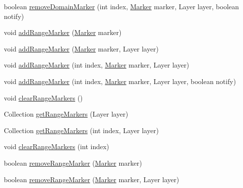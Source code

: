 \begin{DoxyCompactItemize}
\item 
boolean \mbox{\hyperlink{classorg_1_1jfree_1_1chart_1_1plot_1_1_category_plot_a48336c7fe313ae4cd1fa4431236295d0}{remove\+Domain\+Marker}} (int index, \mbox{\hyperlink{classorg_1_1jfree_1_1chart_1_1plot_1_1_marker}{Marker}} marker, Layer layer, boolean notify)
\item 
void \mbox{\hyperlink{classorg_1_1jfree_1_1chart_1_1plot_1_1_category_plot_ab061ff38b94f1ee346e7d49a3c0140b6}{add\+Range\+Marker}} (\mbox{\hyperlink{classorg_1_1jfree_1_1chart_1_1plot_1_1_marker}{Marker}} marker)
\item 
void \mbox{\hyperlink{classorg_1_1jfree_1_1chart_1_1plot_1_1_category_plot_a231e8e9773d07ab24d15452adf8bea19}{add\+Range\+Marker}} (\mbox{\hyperlink{classorg_1_1jfree_1_1chart_1_1plot_1_1_marker}{Marker}} marker, Layer layer)
\item 
void \mbox{\hyperlink{classorg_1_1jfree_1_1chart_1_1plot_1_1_category_plot_a250168a71cfe48c6c97003806a3a585b}{add\+Range\+Marker}} (int index, \mbox{\hyperlink{classorg_1_1jfree_1_1chart_1_1plot_1_1_marker}{Marker}} marker, Layer layer)
\item 
void \mbox{\hyperlink{classorg_1_1jfree_1_1chart_1_1plot_1_1_category_plot_a9be653af2b5f007727578a14ac92453b}{add\+Range\+Marker}} (int index, \mbox{\hyperlink{classorg_1_1jfree_1_1chart_1_1plot_1_1_marker}{Marker}} marker, Layer layer, boolean notify)
\item 
void \mbox{\hyperlink{classorg_1_1jfree_1_1chart_1_1plot_1_1_category_plot_a8d328087c6f781c211f40c6af8af6025}{clear\+Range\+Markers}} ()
\item 
Collection \mbox{\hyperlink{classorg_1_1jfree_1_1chart_1_1plot_1_1_category_plot_ab255d628550a67ceff7dd5a4d58ba9be}{get\+Range\+Markers}} (Layer layer)
\item 
Collection \mbox{\hyperlink{classorg_1_1jfree_1_1chart_1_1plot_1_1_category_plot_abe445338e7bcd63480f291c5dbac24fc}{get\+Range\+Markers}} (int index, Layer layer)
\item 
void \mbox{\hyperlink{classorg_1_1jfree_1_1chart_1_1plot_1_1_category_plot_a2bf4600bbed1d743d9975c18b038c29e}{clear\+Range\+Markers}} (int index)
\item 
boolean \mbox{\hyperlink{classorg_1_1jfree_1_1chart_1_1plot_1_1_category_plot_a3531bdfbf6ce80dd9de8f2dab5fcc61a}{remove\+Range\+Marker}} (\mbox{\hyperlink{classorg_1_1jfree_1_1chart_1_1plot_1_1_marker}{Marker}} marker)
\item 
boolean \mbox{\hyperlink{classorg_1_1jfree_1_1chart_1_1plot_1_1_category_plot_adb5a2b51c5ccf0145d3170da5c686ff5}{remove\+Range\+Marker}} (\mbox{\hyperlink{classorg_1_1jfree_1_1chart_1_1plot_1_1_marker}{Marker}} marker, Layer layer)

\end{DoxyCompactItemize}
